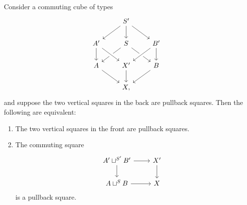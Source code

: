 \begin{thm}\label{thm:cartesian_cube}
Consider a commuting cube of types 
\begin{equation*}\label{eq:cube}
\begin{tikzcd}
& S' \arrow[dl] \arrow[dr] \arrow[d] \\
A' \arrow[d] & S \arrow[dl] \arrow[dr] & B' \arrow[dl,crossing over] \arrow[d] \\
A \arrow[dr] & X' \arrow[d] \arrow[from=ul,crossing over] & B \arrow[dl] \\
& X,
\end{tikzcd}
\end{equation*}
and suppose the two vertical squares in the back are pullback squares. Then the following are equivalent:
\begin{enumerate}
\item The two vertical squares in the front are pullback squares.
\item The commuting square
\begin{equation*}
\begin{tikzcd}
A' \sqcup^{S'} B' \arrow[r] \arrow[d] & X' \arrow[d] \\
A\sqcup^{S} B \arrow[r] & X
\end{tikzcd}
\end{equation*}
is a pullback square.
\end{enumerate}
\end{thm}

